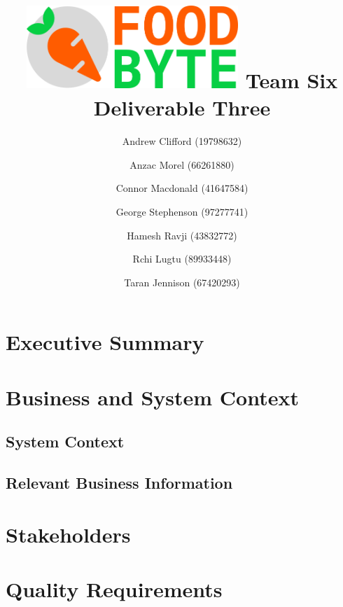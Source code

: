 \documentclass{article}
\begin{document}
	\title{\includegraphics[width=8cm]{images/logo_main.png}\linebreak
		   Team Six Deliverable Three}
	\author{Andrew Clifford (19798632)
		    \and Anzac Morel (66261880)
	    	\and Connor Macdonald (41647584)
    		\and George Stephenson (97277741)
    		\and Hamesh Ravji (43832772)
    		\and Rchi Lugtu (89933448)
    		\and Taran Jennison (67420293)}
	\maketitle
	\pagebreak
	\tableofcontents
	\pagebreak
	
	\section{Executive Summary} 
	
	\pagebreak
	
	\section{Business and System Context}
	
	
	\subsection{System Context}
	
	
	\subsection{Relevant Business Information}
		
	
	\pagebreak
	
	\section{Stakeholders}
	
	\pagebreak
	
	\section{Quality Requirements}
	
	\pagebreak
	
\end{document}
